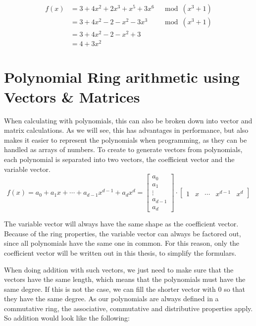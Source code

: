 \begin{align*}
  f(x) & = 3+4x^2+2x^3+x^5+3x^6 & \mod (x^3+1) \\
       & = 3+4x^2-2-x^2-3x^3    & \mod (x^3+1) \\
       & = 3+4x^2-2-x^2+3                      \\
       & = 4+3x^2
\end{align*}

\section{Polynomial Ring arithmetic using Vectors \& Matrices}
\label{sec:PolyMulMath}

When calculating with polynomials, this can also be broken down into vector and matrix calculations. As we will see, this has advantages in performance, but also makes it easier to represent the polynomials when programming, as they can be handled as arrays of numbers. To create to generate vectors from polynomials, each polynomial is separated into two vectors, the coefficient vector and the variable vector.
$$
  f(x) = a_0+ a_1x+\cdots+ a_{d-1}x^{d-1}+a_dx^d =
  \begin{bmatrix}a_0\\a_1\\ \vdots \\a_{d-1}\\a_d \end{bmatrix}
  \cdot
  \begin{bmatrix}1 & x & \cdots & x^{d-1} &  x^d \end{bmatrix}
$$

The variable vector will always have the same shape as the coefficient vector. Because of the ring properties, the variable vector can always be factored out, since all polynomials have the same one in common. For this reason, only the coefficient vector will be written out in this thesis, to simplify the formulars.

When doing addition with such vectors, we just need to make sure that the vectors have the same length, which means that the polynomials must have the same degree. If this is not the case, we can fill the shorter vector with 0 so that they have the same degree. As our polynomials are always defined in a commutative  ring, the associative, commutative and distributive properties apply. So addition would look like the following:

